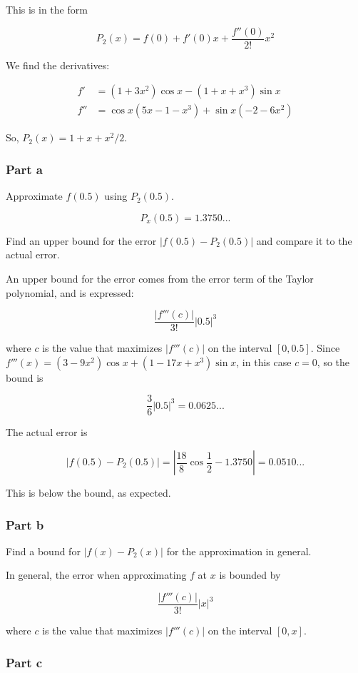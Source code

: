 \documentclass[12pt]{article}
\begin{document}
This is in the form

$$ P_2(x) = f(0) + f'(0)x + \frac{f''(0)}{2!}{x^2}  $$

We find the derivatives:

\begin{align*}
	f' &= (1+3x^2)\cos x - (1+x+x^3)\sin x \\
	f'' &= \cos x(5x - 1 - x^3) + \sin x(-2 - 6x^2)
\end{align*}

So, $	P_2(x) = 1 + x + x^2/2$.

\subsubsection*{Part a}

Approximate $f(0.5)$ using $P_2(0.5)$.

$$ P_x(0.5) = 1.3750... $$

Find an upper bound for the error $|f(0.5) - P_2(0.5)|$ and compare it to the actual error.

An upper bound for the error comes from the error term of the Taylor polynomial, and is expressed:

$$ \frac{|f'''(c)|}{3!}|0.5|^3 $$

where $ c$ is the value that maximizes $|f'''(c)|$ on the interval $[0,0.5]$.
Since $f'''(x) = (3-9x^2)\cos x + (1-17x+x^3) \sin x$, in this case $c = 0$, so the bound is

$$ \frac{3}{6}|0.5|^3 = 0.0625...$$

The actual error is 

$$|f(0.5)-P_2(0.5)| = |\frac{18}{8}\cos \frac{1}{2} - 1.3750| = 0.0510...$$

This is below the bound, as expected.

\subsubsection*{Part b}

Find a bound for $|f(x)-P_2(x)|$ for the approximation in general.

In general, the error when approximating $f$ at $x$ is bounded by

$$ \frac{|f'''(c)|}{3!}|x|^3 $$

where $ c$ is the value that maximizes $|f'''(c)|$ on the interval $[0,x]$.

\subsubsection*{Part c}
\end{document}
